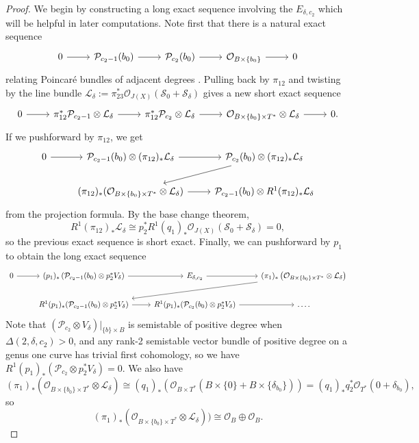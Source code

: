 \documentclass{article}[12pt]
\theoremstyle{definition}
\theoremstyle{remark}
\numberwithin{equation}{section}
\newcommand \mc{\mathcal}
\begin{document}
\begin{proof}
    We begin by constructing a long exact sequence involving the $E_{\delta,c_2}$ which will be helpful in later computations. Note first that there is a natural exact sequence \begin{equation}\label{degrees}\begin{tikzcd}0 \arrow[r] & \mc{P}_{c_2-1}(b_0) \arrow[r] & \mc{P}_{c_2}(b_0) \arrow[r] & \mc{O}_{B \times \{b_0\}} \arrow[r] & 0
    \end{tikzcd}\end{equation}
    relating Poincar\'e bundles of adjacent degrees \cite{CatCil}. Pulling back by $\pi_{12}$ and twisting by the line bundle $\mc{L}_\delta:=\pi_{23}^*\mc{O}_{J(X)}(\mc{S}_0+\mc{S}_\delta)$ gives a new short exact sequence $$\begin{tikzcd}0 \arrow[r] & \pi_{12}^*\mc{P}_{c_2-1}\otimes \mc{L}_\delta \arrow[r] & \pi_{12}^*\mc{P}_{c_2} \otimes \mc{L}_\delta \arrow[r] & \mc{O}_{B\times \{b_0\}\times T^*}\otimes \mc{L}_\delta \arrow[r] & 0.
    \end{tikzcd}$$
    If we pushforward by $\pi_{12}$, we get 
    $$\begin{tikzcd}0 \arrow[r] & \mc{P}_{c_2-1}(b_0)\otimes (\pi_{12})_*\mc{L}_\delta \arrow[r] & \mc{P}_{c_2}(b_0)\otimes (\pi_{12})_*\mc{L}_\delta \arrow[ld] \\
    & (\pi_{12})_*(\mc{O}_{B\times\{b_0\}\times T^*}\otimes \mc{L}_\delta) \arrow[r]   & \mc{P}_{c_2-1}(b_0)\otimes R^1(\pi_{12})_*\mc{L}_\delta
    \end{tikzcd}$$
    from the projection formula. By the base change theorem, $$R^1(\pi_{12})_*\mc{L}_\delta\cong p_2^*R^1(q_1)_*\mc{O}_{J(X)}(\mc{S}_0+\mc{S}_\delta)=0,$$
    so the previous exact sequence is short exact.
    Finally, we can pushforward by $p_1$ to obtain the long exact sequence
     $$\begin{tikzcd}0 \arrow[r] & (p_1)_*\left(\mc{P}_{c_2-1}(b_0)\otimes p_2^*V_\delta\right)\arrow[r] & E_{\delta,c_2} \arrow[r] & (\pi_1)_*\left(\mc{O}_{B\times\{b_0\}\times T^*}\otimes \mc{L}_\delta\right) \arrow[lld] \\
   & R^1(p_1)_*(\mc{P}_{c_2-1}(b_0)\otimes p_2^*V_\delta) \arrow[r] & R^1(p_1)_*(\mc{P}_{c_2}(b_0)\otimes p_2^*V_\delta) \arrow[r] & \ldots .
    \end{tikzcd}$$
    Note that $\left(\mc{P}_{c_2}\otimes V_\delta\right)|_{\{b\}\times B}$ is semistable of positive degree when $\Delta(2,\delta,c_2)>0$, and any rank-2 semistable vector bundle of positive degree on a genus one curve has trivial first cohomology, so we have $R^1(p_1)_*\left(\mc{P}_{c_2}\otimes p_2^*V_\delta\right)=0$. We also have $$(\pi_1)_*\left(\mc{O}_{B\times\{b_0\}\times T^*}\otimes \mc{L}_\delta\right) \cong (q_1)_*(\mc{O}_{B\times T^*}(B\times \{0\}+B\times \{\delta_{b_0}\}))=(q_1)_*q_2^*\mc{O}_{T^*}(0+\delta_{b_0}),$$ so $$(\pi_1)_*\left(\mc{O}_{B\times\{b_0\}\times T^*}\otimes \mc{L}_\delta\right)) \cong \mc{O}_B\oplus\mc{O}_B.$$
    

\end{proof}
\end{document}
